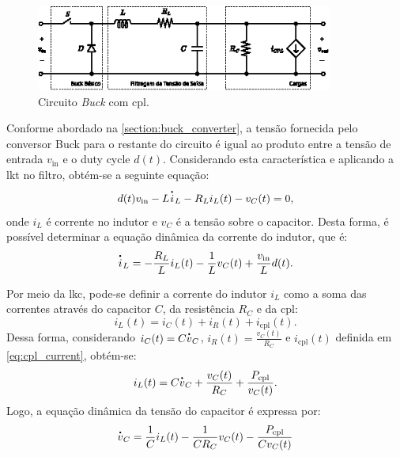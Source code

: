 \begin{figure}[H]
  \centering
  \captionsetup{justification=centering}
  \includegraphics[width=0.87\textwidth]{figuras/buck_converter_circuit.eps}
  \caption{Circuito \textit{Buck} com \acrshort{cpl}.}
  \label{fig:circuit1}
\end{figure}

Conforme abordado na \autoref{section:buck_converter}, a tensão fornecida pelo conversor Buck para o restante do circuito é igual ao produto entre a tensão de entrada $v_{\mathrm{in}}$ e o duty cycle $d(t)$. Considerando esta característica e aplicando a \acrfull{lkt} no filtro, obtém-se a seguinte equação: \begin{equation} d(t)v_{\mathrm{in}} - L \dt{i}_L - R_L i_L(t) - v_C(t) = 0, \end{equation} onde $i_L$ é corrente no indutor e $v_C$ é a tensão sobre o capacitor. Desta forma, é possível determinar a equação dinâmica da corrente do indutor, que é: \begin{equation} \dt{i}_L = - \frac{R_L}{L} i_L(t) - \frac{1}{L} v_C(t) + \frac{v_{\mathrm{in}}}{L}d(t). \label{eq:buck_converter_current} \end{equation}

Por meio da \acrfull{lkc}, pode-se definir a corrente do indutor $i_{L}$ como a soma das correntes através do capacitor $C$, da resistência $R_C$ e da \acrshort{cpl}: \begin{equation} i_L(t) = i_C(t) + i_R(t) + i_{\mathrm{cpl}}(t). \end{equation} Dessa forma, considerando $i_C(t) = C\dt{v}_C$, $i_R(t) = \frac{v_C(t)}{R_C}$ e $i_{\mathrm{cpl}}(t)$ definida em \eqref{eq:cpl_current}, obtém-se: \begin{equation} i_L(t) = C\dt{v}_C + \frac{v_C(t)}{R_C} + \frac{P_{\mathrm{cpl}}}{v_C(t)}. \end{equation} Logo, a equação dinâmica da tensão do capacitor é expressa por: \begin{equation} \dt{v}_C = \frac{1}{C} i_L(t) - \frac{1}{CR_C}v_C(t) - \frac{P_{\mathrm{cpl}}}{Cv_C(t)} \label{eq:buck_converter_voltage} \end{equation}

